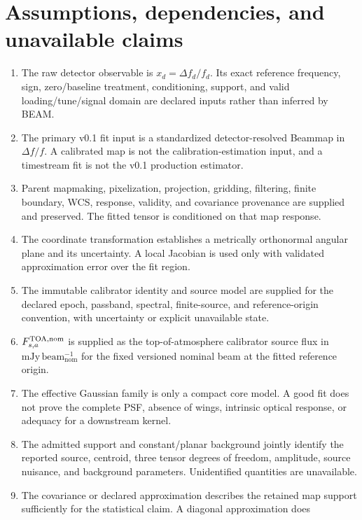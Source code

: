 \section{Assumptions, dependencies, and unavailable claims}
\label{sec:assumptions}
\begin{enumerate}[label=\textbf{A\arabic*.}]
\item The raw detector observable is $x_d=\Delta f_d/f_d$. Its exact reference
frequency, sign, zero/baseline treatment, conditioning, support, and valid
loading/tune/signal domain are declared inputs rather than inferred by BEAM.
\item The primary v0.1 fit input is a standardized detector-resolved Beammap in
$\Delta f/f$. A calibrated map is not the calibration-estimation input, and a
timestream fit is not the v0.1 production estimator.
\item Parent mapmaking, pixelization, projection, gridding, filtering, finite
boundary, WCS, response, validity, and covariance provenance are supplied and
preserved. The fitted tensor is conditioned on that map response.
\item The coordinate transformation establishes a metrically orthonormal
angular plane and its uncertainty. A local Jacobian is used only with validated
approximation error over the fit region.
\item The immutable calibrator identity and source model are supplied for the
declared epoch, passband, spectral, finite-source, and reference-origin
convention, with uncertainty or explicit unavailable state.
\item $F^{\rm TOA,nom}_{s,a}$ is supplied as the top-of-atmosphere calibrator
source flux in $\mathrm{mJy\,beam_{nom}^{-1}}$ for the fixed versioned nominal
beam at the fitted reference origin.
\item The effective Gaussian family is only a compact core model. A good fit
does not prove the complete PSF, absence of wings, intrinsic optical response,
or adequacy for a downstream kernel.
\item The admitted support and constant/planar background jointly identify the
reported source, centroid, three tensor degrees of freedom, amplitude, source
nuisance, and background parameters. Unidentified quantities are unavailable.
\item The covariance or declared approximation describes the retained map
support sufficiently for the statistical claim. A diagonal approximation does

\end{enumerate}
